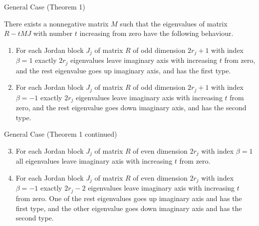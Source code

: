 \begin{frame}{General Case (Theorem 1)}


\begin{theorem}
There exists a nonnegative matrix $M$ such that the eigenvalues of matrix $R-tMJ$ with number $t$ increasing from zero have the following behaviour.
\begin{enumerate}


\item For each Jordan block $J_{j}$ of matrix $R$ of odd dimension $2r_{j}+1$ with index $\beta=1$ exactly $2r_{j}$ eigenvalues leave imaginary axis with increasing $t$ from zero, and the rest eigenvalue goes up imaginary axis, and has the first type.

\item For each Jordan block $J_{j}$ of matrix $R$ of odd dimension $2r_{j}+1$ with index $\beta=-1$ exactly $2r_{j}$ eigenvalues leave imaginary axis with increasing $t$ from zero, and the rest eigenvalue goes down imaginary axis, and has the second type.

\end{enumerate}
\end{theorem}
\end{frame}

\begin{frame}{General Case (Theorem 1 continued)}
\begin{theorem}

\begin{enumerate}
\setcounter{enumi}{2}

\item For each Jordan block $J_{j}$ of matrix $R$ of even dimension $2r_{j}$ with index $\beta=1$ all eigenvalues leave imaginary axis with increasing $t$ from zero.

\item For each Jordan block $J_{j}$ of matrix $R$ of even dimension $2r_{j}$ with index $\beta=-1$ exactly $2r_{j}-2$ eigenvalues leave imaginary axis with increasing $t$ from zero. One of the rest eigenvalues goes up imaginary axis and has the first type, and the other eigenvalue goes down imaginary axis and has the second type.
\end{enumerate}

\end{theorem}


\end{frame}


